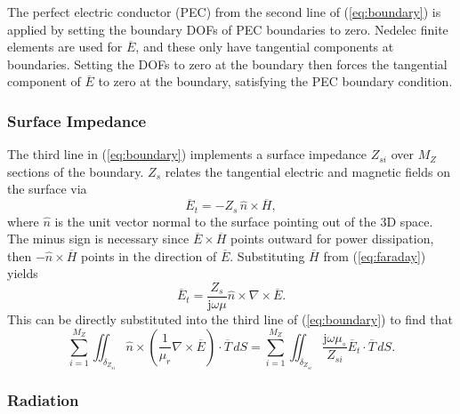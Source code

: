 \documentclass[titlepage]{article}
\renewcommand\_{\textunderscore\linebreak[1]}
\begin{document}
The perfect electric conductor (PEC) from the second line of (\ref{eq:boundary}) is applied by setting the boundary DOFs of PEC boundaries to zero.  Nedelec finite elements are used for $\overline{E}$, and these only have tangential components at boundaries.  Setting the DOFs to zero at the boundary then forces the tangential component of $\overline{E}$ to zero at the boundary, satisfying the PEC boundary condition.

\subsubsection{Surface Impedance}

The third line in (\ref{eq:boundary}) implements a surface impedance $Z_{si}$ over $M_Z$ sections of the boundary. $Z_s$ relates the tangential electric and magnetic fields on the surface via
\begin{equation}
\overline{E}_t=-Z_s\,\hat{n}\times\overline{H},
\end{equation}
where $\hat{n}$ is the unit vector normal to the surface pointing out of the 3D space.  The minus sign is necessary since $\overline{E}\times\overline{H}$ points outward for power dissipation, then $-\hat{n}\times\overline{H}$ points in the direction of $\overline{E}$.  Substituting $\overline{H}$ from (\ref{eq:faraday}) yields
\begin{equation}
\overline{E}_t=\frac{Z_s}{\text{j}\omega\mu}\hat{n}\times\nabla\times\overline{E}.
\end{equation}
This can be directly substituted into the third line of (\ref{eq:boundary}) to find that
\begin{equation}
\label{eq:third_term}
\sum_{i=1}^{M_Z}\iint_{\delta_{Z_{si}}}\hat{n}\times(\frac{1}{\mu_r}\nabla\times\overline{E})\cdot\overline{T}\,dS=\sum_{i=1}^{M_Z}\iint_{\delta_{Z_{si}}} \frac{\text{j}\omega\mu_{\circ}}{Z_{si}}\overline{E}_t\cdot\overline{T}\,dS.
\end{equation}

\subsubsection{Radiation}
\end{document}
